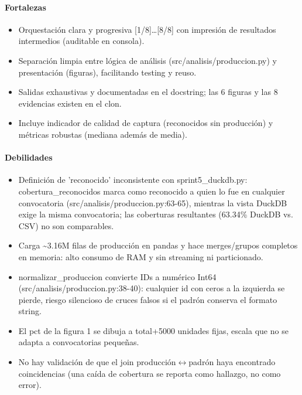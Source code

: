 \paragraph{Fortalezas}
\begin{itemize}
  \item Orquestación clara y progresiva [1/8]\dots{}[8/8] con impresión de resultados intermedios (auditable en consola).
  \item Separación limpia entre lógica de análisis (src/analisis/produccion.py) y presentación (figuras), facilitando testing y reuso.
  \item Salidas exhaustivas y documentadas en el docstring; las 6 figuras y las 8 evidencias existen en el clon.
  \item Incluye indicador de calidad de captura (reconocidos sin producción) y métricas robustas (mediana además de media).
\end{itemize}

\paragraph{Debilidades}
\begin{itemize}
  \item Definición de 'reconocido' inconsistente con sprint5\_duckdb.py: cobertura\_reconocidos marca como reconocido a quien lo fue en cualquier convocatoria (src/analisis/produccion.py:63-65), mientras la vista DuckDB exige la misma convocatoria; las coberturas resultantes (63.34\% DuckDB vs. CSV) no son comparables.
  \item Carga \textasciitilde{}3.16M filas de producción en pandas y hace merges/grupos completos en memoria: alto consumo de RAM y sin streaming ni particionado.
  \item normalizar\_produccion convierte IDs a numérico Int64 (src/analisis/produccion.py:38-40): cualquier id con ceros a la izquierda se pierde, riesgo silencioso de cruces falsos si el padrón conserva el formato string.
  \item El pct de la figura 1 se dibuja a total+5000 unidades fijas, escala que no se adapta a convocatorias pequeñas.
  \item No hay validación de que el join producción$\leftrightarrow$padrón haya encontrado coincidencias (una caída de cobertura se reporta como hallazgo, no como error).
\end{itemize}

